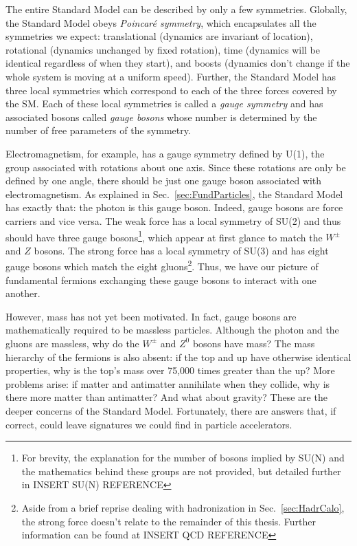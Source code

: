 The entire Standard Model can be described by only a few symmetries. Globally, the Standard Model obeys \textit{Poincar\'{e} symmetry}, which encapsulates all the symmetries we expect: translational (dynamics are invariant of location), rotational (dynamics unchanged by fixed rotation), time (dynamics will be identical regardless of when they start), and boosts (dynamics don't change if the whole system is moving at a uniform speed). Further, the Standard Model has three local symmetries which correspond to each of the three forces covered by the SM. Each of these local symmetries is called a {\it gauge symmetry} and has associated bosons called {\it gauge bosons} whose number is determined by the number of free parameters of the symmetry.

Electromagnetism, for example, has a gauge symmetry defined by U(1), the group associated with rotations about one axis. Since these rotations are only be defined by one angle, there should be just one gauge boson associated with electromagnetism. As explained in Sec.~\ref{sec:FundParticles}, the Standard Model has exactly that: the photon is this gauge boson. Indeed, gauge bosons are force carriers and vice versa. The weak force has a local symmetry of SU(2) and thus should have three gauge bosons\footnote{For brevity, the explanation for the number of bosons implied by SU(N) and the mathematics behind these groups are not provided, but detailed further in INSERT SU(N) REFERENCE}, which appear at first glance to match the $W^{\pm}$ and $Z$ bosons. The strong force has a local symmetry of SU(3) and has eight gauge bosons which match the eight gluons\footnote{Aside from a brief reprise dealing with hadronization in Sec.~\ref{sec:HadrCalo}, the strong force doesn't relate to the remainder of this thesis. Further information can be found at INSERT QCD REFERENCE}. Thus, we have our picture of fundamental fermions exchanging these gauge bosons to interact with one another.

However, mass has not yet been motivated. In fact, gauge bosons are mathematically required to be massless particles. Although the photon and the gluons are massless, why do the $W^{\pm}$ and $Z^{0}$ bosons have mass? The mass hierarchy of the fermions is also absent: if the top and up have otherwise identical properties, why is the top's mass over 75,000 times greater than the up? More problems arise: if matter and antimatter annihilate when they collide, why is there more matter than antimatter? And what about gravity? These are the deeper concerns of the Standard Model. Fortunately, there are answers that, if correct, could leave signatures we could find in particle accelerators.

